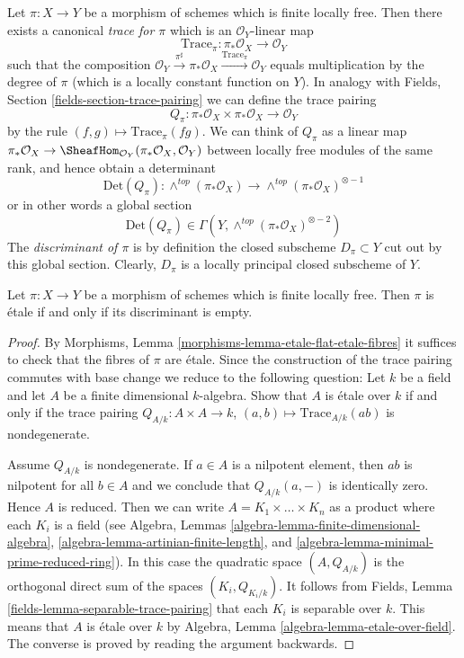 \noindent
Let $\pi : X \to Y$ be a morphism of schemes which is finite locally
free. Then there exists a canonical {\it trace for $\pi$}
which is an $\mathcal{O}_Y$-linear map
$$
\text{Trace}_\pi : \pi_*\mathcal{O}_X \longrightarrow \mathcal{O}_Y
$$
such that the composition
$\mathcal{O}_Y \xrightarrow{\pi^\sharp} \pi_*\mathcal{O}_X
\xrightarrow{\text{Trace}_\pi} \mathcal{O}_Y$ equals
multiplication by the degree of $\pi$ (which is a locally constant
function on $Y$). In analogy with
Fields, Section \ref{fields-section-trace-pairing}
we can define the trace pairing
$$
Q_\pi :
\pi_*\mathcal{O}_X \times \pi_*\mathcal{O}_X
\longrightarrow
\mathcal{O}_Y
$$
by the rule $(f, g) \mapsto \text{Trace}_\pi(fg)$. We can think of
$Q_\pi$ as a linear map
$\pi_*\mathcal{O}_X \to
\SheafHom_{\mathcal{O}_Y}(\pi_*\mathcal{O}_X, \mathcal{O}_Y)$
between locally free modules of the same rank, and hence obtain
a determinant
$$
\text{Det}(Q_\pi) :
\wedge^{top}(\pi_*\mathcal{O}_X)
\longrightarrow
\wedge^{top}(\pi_*\mathcal{O}_X)^{\otimes -1}
$$
or in other words a global section
$$
\text{Det}(Q_\pi) \in \Gamma(Y, \wedge^{top}(\pi_*\mathcal{O}_X)^{\otimes -2})
$$
The {\it discriminant of $\pi$} is by definition the closed
subscheme $D_\pi \subset Y$ cut out by this global section.
Clearly, $D_\pi$ is a locally principal closed subscheme of $Y$.

\begin{lemma}
\label{lemma-discriminant}
Let $\pi : X \to Y$ be a morphism of schemes which is finite locally
free. Then $\pi$ is \'etale if and only if its discriminant is empty.
\end{lemma}

\begin{proof}
By Morphisms, Lemma \ref{morphisms-lemma-etale-flat-etale-fibres}
it suffices to check that the fibres of $\pi$ are \'etale.
Since the construction of the trace pairing commutes with base
change we reduce to the following question: Let $k$ be a field
and let $A$ be a finite dimensional $k$-algebra. Show that
$A$ is \'etale over $k$ if and only if the trace pairing
$Q_{A/k} : A \times A \to k$, $(a, b) \mapsto \text{Trace}_{A/k}(ab)$
is nondegenerate.

\medskip\noindent
Assume $Q_{A/k}$ is nondegenerate. If $a \in A$ is a nilpotent element, then
$ab$ is nilpotent for all $b \in A$ and we conclude that $Q_{A/k}(a, -)$ is
identically zero. Hence $A$ is reduced. Then we can write
$A = K_1 \times \ldots \times K_n$ as a product where each $K_i$
is a field (see
Algebra, Lemmas \ref{algebra-lemma-finite-dimensional-algebra},
\ref{algebra-lemma-artinian-finite-length}, and
\ref{algebra-lemma-minimal-prime-reduced-ring}).
In this case the quadratic
space $(A, Q_{A/k})$ is the orthogonal direct sum of the spaces
$(K_i, Q_{K_i/k})$. It follows from
Fields, Lemma \ref{fields-lemma-separable-trace-pairing}
that each $K_i$ is separable over $k$. This means that $A$ is \'etale
over $k$ by Algebra, Lemma \ref{algebra-lemma-etale-over-field}.
The converse is proved by reading the argument backwards.
\end{proof}

